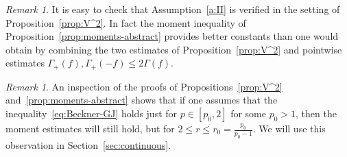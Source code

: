 \documentclass[a4paper]{amsart}
\theoremstyle{definition}
\theoremstyle{remark}
\newtheorem{remark}[theorem]{Remark}
\numberwithin{equation}{section}
\begin{document}
\begin{remark} It is easy to check that Assumption~\ref{a:II}  is verified in the setting of Proposition~\ref{prop:V^2}. In fact the moment inequality of Proposition~\ref{prop:moments-abstract} provides better constants than one would obtain by combining the two estimates of Proposition~\ref{prop:V^2} and pointwise estimates $\Gamma_+(f),\Gamma_+(-f)\le 2 \Gamma(f)$.
\end{remark}

\begin{remark} \label{re:uwaga-o-momentach}
An inspection of the proofs of Propositions~\ref{prop:V^2} and~\ref{prop:moments-abstract} shows that if one assumes that the inequality~\eqref{eq:Beckner-GJ} holds just for $p \in [p_0,2]$ for some $p_0 > 1$, then the moment estimates will still hold, but for $2 \le r \le r_0 = \frac{p_0}{p_0-1}$. We will use this observation in Section~\ref{sec:continuous}.
\end{remark}
\end{document}

